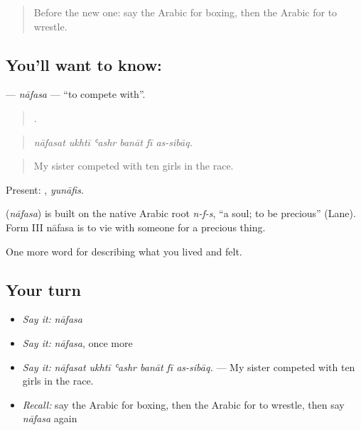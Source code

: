 \label{lesson:AR-C548-nafasa}



\begin{quote}
Before the new one: say the Arabic for boxing, then the Arabic for to wrestle.
\end{quote}

\subsection*{You'll want to know: }
\textbf{} — \emph{nāfasa} — \textquotedblleft{}to compete with\textquotedblright{}.

\begin{quote}
     .
\end{quote}

\begin{quote}
\emph{nāfasat ukhtī ʿashr banāt fī as-sibāq.}
\end{quote}

\begin{quote}
My sister competed with ten girls in the race.
\end{quote}

Present: , \emph{yunāfis}.

\begin{cousinweb}
\textbf{} (\emph{nāfasa}) is built on the native Arabic root \emph{n-f-s}, \textquotedblleft{}a soul; to be precious\textquotedblright{} (Lane). Form III nāfasa is to vie with someone for a precious thing.
\end{cousinweb}

\begin{grammarlens}[title={What you've built}]
One more word for describing what you lived and felt.
\end{grammarlens}

\subsection*{Your turn}
\begin{itemize}
\raggedright
  \item \emph{Say it:} \emph{nāfasa}
  \item \emph{Say it:} \emph{nāfasa}, once more
  \item \emph{Say it:} \emph{nāfasat ukhtī ʿashr banāt fī as-sibāq.} — My sister competed with ten girls in the race.
  \item \emph{Recall:} say the Arabic for boxing, then the Arabic for to wrestle, then say \emph{nāfasa} again
\end{itemize}

